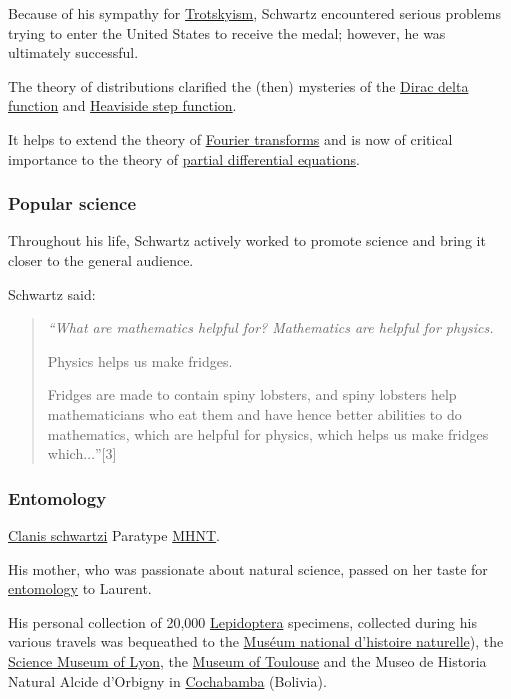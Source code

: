 \documentclass{article}
\begin{document}
Because of his sympathy for \href{https://en.wikipedia.org/wiki/Trotskyism}{Trotskyism}, Schwartz encountered serious problems trying to enter the United States to receive the medal; however, he was ultimately successful.

%
The theory of distributions clarified the (then) mysteries of the \href{https://en.wikipedia.org/wiki/Dirac_delta_function}{Dirac delta function} and \href{https://en.wikipedia.org/wiki/Heaviside_step_function}{Heaviside step function}.

It helps to extend the theory of \href{https://en.wikipedia.org/wiki/Fourier_transform}{Fourier transforms} and is now of critical importance to the theory of \href{https://en.wikipedia.org/wiki/Partial_differential_equation}{partial differential equations}.

\subsubsection{Popular science}
Throughout his life, Schwartz actively worked to promote science and bring it closer to the general audience.

Schwartz said:
\begin{quotation}\it
	``What are mathematics helpful for? Mathematics are helpful for physics.
	
	Physics helps us make fridges.
	
	Fridges are made to contain spiny lobsters, and spiny lobsters help mathematicians who eat them and have hence better abilities to do mathematics, which are helpful for physics, which helps us make fridges which$\ldots$''[3]
\end{quotation}

\subsubsection{Entomology}
\textsf{\href{https://en.wikipedia.org/wiki/Clanis_schwartzi}{Clanis schwartzi} Paratype \href{https://en.wikipedia.org/wiki/MHNT}{MHNT}.}

His mother, who was passionate about natural science, passed on her taste for \href{https://en.wikipedia.org/wiki/Entomology}{entomology} to Laurent.

His personal collection of 20,000 \href{https://en.wikipedia.org/wiki/Lepidoptera}{Lepidoptera} specimens, collected during his various travels was bequeathed to the \href{https://en.wikipedia.org/wiki/National_Museum_of_Natural_History_(France)}{Muséum national d'histoire naturelle}), the \href{https://en.wikipedia.org/wiki/Mus%C3%A9e_des_Confluences}{Science Museum of Lyon}, the \href{https://en.wikipedia.org/wiki/Mus%C3%A9um_de_Toulouse}{Museum of Toulouse} and the Museo de Historia Natural Alcide d'Orbigny in \href{https://en.wikipedia.org/wiki/Cochabamba}{Cochabamba} (Bolivia).
\end{document}
